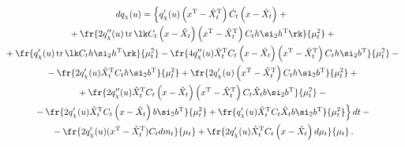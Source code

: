 \begin{multline}

dq_\chi (u) =\left\{

\vphantom{\fr{2q_\chi' (u) \hat X_t^{\mathrm{T}} C_t\left(x-\hat X_t\right)

    b\si_2 b^{\mathrm{T}}}{\mu_t^2}}

 q_\chi' (u) \left(x^{\mathrm{T}} -\hat X_t^{\mathrm{T}}\right) 

\dot C_t \left(x-\hat  X_t\right)+{}\right.\\

{}+\fr{2q_\chi'' (u)\,\mathrm{tr}\, \lk C_t\left(x-\hat X_t\right) 

\left(x^{\mathrm{T}} -\hat X_t^{\mathrm{T}}\right)

    C_th \si_2 h^{\mathrm{T}}\rk}{\mu_t^2}+{}\\

 {}+\fr{q_\chi' (u) \,\mathrm{tr}\,\lk C_th\si_2

    h^{\mathrm{T}}\rk}{\mu_t^2} - 

    \fr{4 q_\chi'' (u) \hat X_t^{\mathrm{T}} C_t

    \left(x-\hat X_t\right)\left(x^{\mathrm{T}}-\hat X_t^{\mathrm{T}}\right)

 C_t h\si_2 b^{\mathrm{T}}}{\mu_t^2} -{}\\

 {}- \fr{2 q_\chi'(u) \hat X_t^{\mathrm{T}}

    C_th \si_2 b^{\mathrm{T}}}{\mu_t^2}+

    \fr{2 q_\chi' (u) \left(x^{\mathrm{T}}-\hat X_t^{\mathrm{T}}\right) C_t h\si_2

    b^{\mathrm{T}}}{\mu_t^2}+{}\\

{}+\fr{2q_\chi'' (u) \hat X_t^{\mathrm{T}} C_t\left(x-\hat X_t\right)

\left(x^{\mathrm{T}}-\hat X_t^{\mathrm{T}}\right)

    C_t\hat X_t b \si_2 b^{\mathrm{T}}}{\mu_t^2}-{}\\

\left.{}-\fr{2q_\chi' (u) \hat X_t^{\mathrm{T}} C_t\left(x-\hat X_t\right)

    b\si_2 b^{\mathrm{T}}}{\mu_t^2} + \fr{q_\chi'(u) \hat X_t^{\mathrm{T}}  

    C_t\hat X_t b \si_2 b^{\mathrm{T}} }{\mu_t^2}\right\} dt-{}\\

{}-\fr{2q_\chi'(u) (x^{\mathrm{T}}-\hat X_t^{\mathrm{T}}) C_t dm_t}{\mu_t} +

    \fr{2q_\chi' (u) \hat X_t^{\mathrm{T}} C_t\left(x-\hat X_t\right) d\mu_t}{\mu_t}\,.

    \label{e3.17-s2}

    \end{multline}



